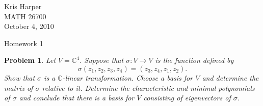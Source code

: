 \documentclass{article}
\newtheorem{problem}{Problem}
\begin{document}
\begin{flushright}
Kris Harper\\

MATH 26700\\

October 4, 2010
\end{flushright}

\begin{center}
Homework 1
\end{center}

\begin{problem}
Let $V = \mathbb{C}^4$. Suppose that $\sigma : V \to V$ is the function defined by
\[
\sigma(z_1, z_2, z_3, z_4) = (z_3, z_4, z_1, z_2).
\]
Show that $\sigma$ is a $\mathbb{C}$-linear transformation. Choose a basis for $V$ and determine the matrix of $\sigma$ relative to it. Determine the characteristic and minimal polynomials of $\sigma$ and conclude that there is a basis for $V$ consisting of eigenvectors of $\sigma$.
\end{problem}
\end{document}
